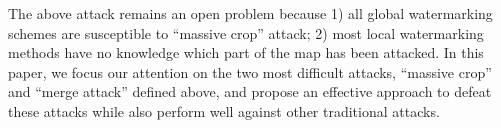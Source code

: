 The above attack remains an open problem because
1) all global watermarking schemes are susceptible to ``massive crop'' attack; 
2) most local watermarking methods have no knowledge which part of the
map has been attacked. 
%
In this paper, we focus our attention on the two most difficult attacks, 
``massive crop'' and ``merge attack'' defined above, 
and propose an effective approach to defeat these
attacks while also perform well against other traditional attacks.




